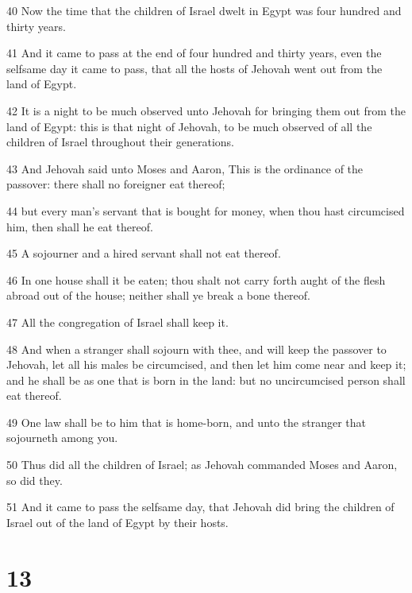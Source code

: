 \par 40 Now the time that the children of Israel dwelt in Egypt was four hundred and thirty years.
\par 41 And it came to pass at the end of four hundred and thirty years, even the selfsame day it came to pass, that all the hosts of Jehovah went out from the land of Egypt.
\par 42 It is a night to be much observed unto Jehovah for bringing them out from the land of Egypt: this is that night of Jehovah, to be much observed of all the children of Israel throughout their generations.
\par 43 And Jehovah said unto Moses and Aaron, This is the ordinance of the passover: there shall no foreigner eat thereof;
\par 44 but every man's servant that is bought for money, when thou hast circumcised him, then shall he eat thereof.
\par 45 A sojourner and a hired servant shall not eat thereof.
\par 46 In one house shall it be eaten; thou shalt not carry forth aught of the flesh abroad out of the house; neither shall ye break a bone thereof.
\par 47 All the congregation of Israel shall keep it.
\par 48 And when a stranger shall sojourn with thee, and will keep the passover to Jehovah, let all his males be circumcised, and then let him come near and keep it; and he shall be as one that is born in the land: but no uncircumcised person shall eat thereof.
\par 49 One law shall be to him that is home-born, and unto the stranger that sojourneth among you.
\par 50 Thus did all the children of Israel; as Jehovah commanded Moses and Aaron, so did they.
\par 51 And it came to pass the selfsame day, that Jehovah did bring the children of Israel out of the land of Egypt by their hosts.

\chapter{13}

